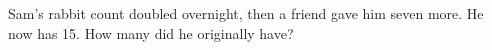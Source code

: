 Sam's rabbit count doubled overnight, then a friend gave him seven more. He now has 15. How many did he originally have?
